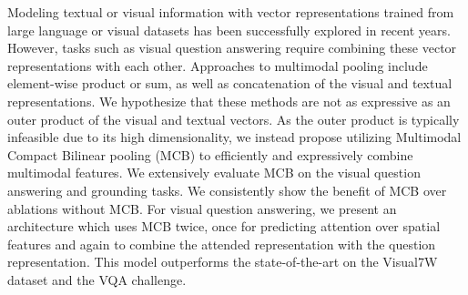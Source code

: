 Modeling textual or visual information with vector representations trained from large language or visual datasets has been successfully explored in recent years. However, tasks such as visual question answering require combining these vector representations with each other. Approaches to multimodal pooling include element-wise product or sum, as well as concatenation of the visual and textual representations. We hypothesize that these methods are not as expressive as an outer product of the visual and textual vectors. As the outer product is typically infeasible due to its high dimensionality, we instead propose utilizing Multimodal Compact Bilinear pooling (MCB) to efficiently and expressively combine multimodal features. We extensively evaluate MCB on the visual question answering and grounding tasks. We consistently show the benefit of  MCB over ablations without MCB. For visual question answering, we present an architecture which uses MCB twice, once for predicting attention over spatial features and again to combine the attended representation with the question representation. This model outperforms the state-of-the-art on the Visual7W dataset and the VQA challenge.

